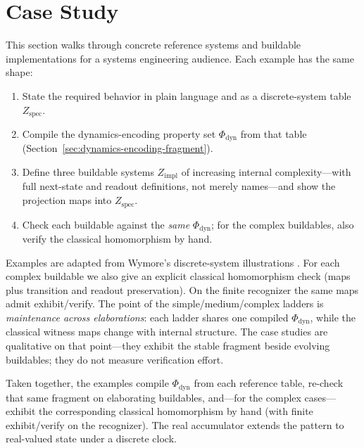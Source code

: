\section{Case Study}
\label{sec:case-study}

This section walks through concrete reference systems and buildable implementations for a systems engineering audience. Each example has the same shape:
\begin{enumerate}
    \item State the required behavior in plain language and as a discrete-system table $Z_{\text{spec}}$.
    \item Compile the dynamics-encoding property set $\Phi_{\mathrm{dyn}}$ from that table (Section~\ref{sec:dynamics-encoding-fragment}).
    \item Define three buildable systems $Z_{\text{impl}}$ of increasing internal complexity---with full next-state and readout definitions, not merely names---and show the projection maps into $Z_{\text{spec}}$.
    \item Check each buildable against the \emph{same} $\Phi_{\mathrm{dyn}}$; for the complex buildables, also verify the classical homomorphism by hand.
\end{enumerate}
Examples are adapted from Wymore's discrete-system illustrations \citep{Wymore1993}. For each complex buildable we also give an explicit classical homomorphism check (maps plus transition and readout preservation). On the finite recognizer the same maps admit exhibit/verify. The point of the simple/medium/complex ladders is \emph{maintenance across elaborations}: each ladder shares one compiled $\Phi_{\mathrm{dyn}}$, while the classical witness maps change with internal structure. The case studies are qualitative on that point---they exhibit the stable fragment beside evolving buildables; they do not measure verification effort.




Taken together, the examples compile $\Phi_{\mathrm{dyn}}$ from each reference table, re-check that same fragment on elaborating buildables, and---for the complex cases---exhibit the corresponding classical homomorphism by hand (with finite exhibit/verify on the recognizer). The real accumulator extends the pattern to real-valued state under a discrete clock.
